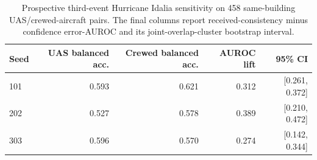 \begin{table}[t]
\centering
\caption{Prospective third-event Hurricane Idalia sensitivity on 458 same-building UAS/crewed-aircraft pairs. The final columns report received-consistency minus confidence error-AUROC and its joint-overlap-cluster bootstrap interval.}
\label{tab:idalia}
\begin{tabular}{lrrrr}
\toprule
Seed & UAS balanced acc. & Crewed balanced acc. & AUROC lift & 95\% CI \\
\midrule
101 & 0.593 & 0.621 & 0.312 & [0.261, 0.372] \\
202 & 0.527 & 0.578 & 0.389 & [0.210, 0.472] \\
303 & 0.596 & 0.570 & 0.274 & [0.142, 0.344] \\
\bottomrule
\end{tabular}
\end{table}
